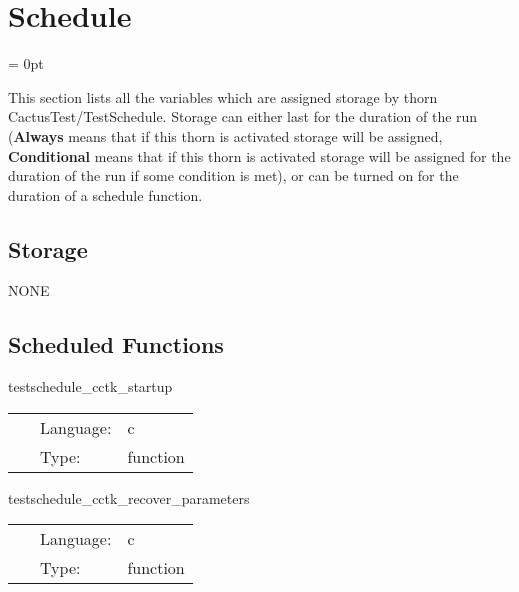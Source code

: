 
\section{Schedule} 


\parskip = 0pt


\noindent This section lists all the variables which are assigned storage by thorn CactusTest/TestSchedule.  Storage can either last for the duration of the run ({\bf Always} means that if this thorn is activated storage will be assigned, {\bf Conditional} means that if this thorn is activated storage will be assigned for the duration of the run if some condition is met), or can be turned on for the duration of a schedule function.


\subsection*{Storage}NONE
\subsection*{Scheduled Functions}
\vspace{5mm}


\hspace{5mm} testschedule\_cctk\_startup 

\hspace{5mm}{\it test to see if function is placed in schedule and run at cctk\_startup } 


\hspace{5mm}

 \begin{tabular*}{160mm}{cll} 
~ & Language:  & c \\ 
~ & Type:  & function \\ 
\end{tabular*} 


\vspace{5mm}


\hspace{5mm} testschedule\_cctk\_recover\_parameters 

\hspace{5mm}{\it test to see if function is placed in schedule and run at cctk\_recover\_parameters } 


\hspace{5mm}

 \begin{tabular*}{160mm}{cll} 
~ & Language:  & c \\ 
~ & Type:  & function \\ 
\end{tabular*} 


